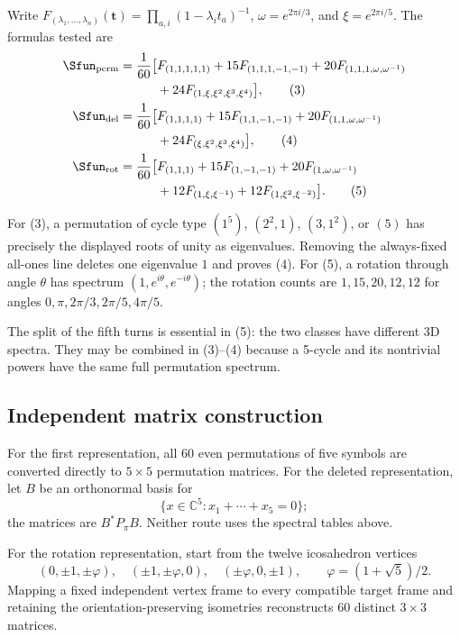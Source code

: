 \documentclass[10pt]{article}
\begin{document}
Write $F_{(\lambda_1,\ldots,\lambda_n)}(\mathbf t)
=\prod_{a,i}(1-\lambda_i t_a)^{-1}$,
$\omega=e^{2\pi i/3}$, and $\xi=e^{2\pi i/5}$.  The formulas tested are
\begin{align}
\Sfun_{\rm perm}=\frac1{60}\big[&F_{(1,1,1,1,1)}
+15F_{(1,1,1,-1,-1)}+20F_{(1,1,1,\omega,\omega^{-1})}\notag\\
&+24F_{(1,\xi,\xi^2,\xi^3,\xi^4)}\big],                  \tag{3}\\
\Sfun_{\rm del}=\frac1{60}\big[&F_{(1,1,1,1)}
+15F_{(1,1,-1,-1)}+20F_{(1,1,\omega,\omega^{-1})}\notag\\
&+24F_{(\xi,\xi^2,\xi^3,\xi^4)}\big],                   \tag{4}\\
\Sfun_{\rm rot}=\frac1{60}\big[&F_{(1,1,1)}
+15F_{(1,-1,-1)}+20F_{(1,\omega,\omega^{-1})}\notag\\
&+12F_{(1,\xi,\xi^{-1})}+12F_{(1,\xi^2,\xi^{-2})}\big]. \tag{5}
\end{align}

For (3), a permutation of cycle type $(1^5)$, $(2^2,1)$, $(3,1^2)$,
or $(5)$ has precisely the displayed roots of unity as eigenvalues.  Removing
the always-fixed all-ones line deletes one eigenvalue $1$ and proves (4).
For (5), a rotation through angle $\theta$ has spectrum
$(1,e^{i\theta},e^{-i\theta})$; the rotation counts are
$1,15,20,12,12$ for angles $0,\pi,2\pi/3,2\pi/5,4\pi/5$.

The split of the fifth turns is essential in (5): the two classes have
different 3D spectra.  They may be combined in (3)--(4) because a 5-cycle and
its nontrivial powers have the same full permutation spectrum.

\subsection{Independent matrix construction}

For the first representation, all 60 even permutations of five symbols are
converted directly to $5\times5$ permutation matrices.  For the deleted
representation, let $B$ be an orthonormal basis for
\[
\{x\in\mathbb C^5:x_1+\cdots+x_5=0\};
\]
the matrices are $B^*P_\pi B$.  Neither route uses the spectral tables above.

For the rotation representation, start from the twelve icosahedron vertices
\[
(0,\pm1,\pm\varphi),\quad(\pm1,\pm\varphi,0),\quad
(\pm\varphi,0,\pm1),\qquad \varphi=(1+\sqrt5)/2.
\]
Mapping a fixed independent vertex frame to every compatible target frame and
retaining the orientation-preserving isometries reconstructs 60 distinct
$3\times3$ matrices.
\end{document}
